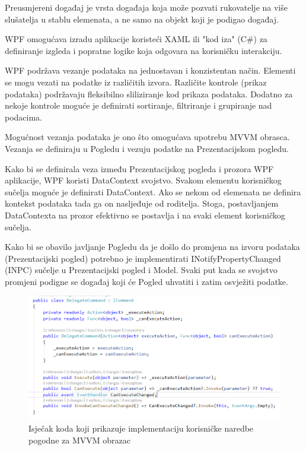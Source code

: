 \documentclass[times, utf8, diplomski]{fer}
\begin{document}
Preusmjereni događaj  je vrsta događaja koja može pozvati rukovatelje  na više slušatelja u stablu elemenata, a ne samo na objekt koji je podigao događaj. 

WPF omogućava izradu aplikacije koristeći XAML ili "kod iza" (C\#) za definiranje izgleda i popratne logike koja odgovara na korisničku interakciju.

WPF podržava vezanje podataka na jednostavan i konzistentan način. Elementi se mogu vezati na podatke iz različitih izvora. Različite kontrole (prikaz podataka) podržavaju fleksibilno sliliziranje kod prikaza podataka. Dodatno za nekoje kontrole moguće je definirati sortiranje, filtriranje i grupiranje nad podacima.

Mogućnost vezanja podataka je ono što omogućava upotrebu MVVM obrasca. Vezanja se definiraju u Pogledu i vezuju podatke na Prezentacijskom pogledu.

Kako bi se definirala veza između Prezentacijskog pogleda i prozora WPF aplikacije, WPF koristi DataContext svojstvo. Svakom elementu korisničkog sučelja moguće je definirati DataContext. Ako se nekom od elemenata ne definira kontekst podataka tada ga on nasljeđuje od roditelja. Stoga, postavljanjem DataContexta na prozor efektivno se postavlja i na svaki element korisničkog sučelja.

Kako bi se obavilo javljanje Pogledu da je došlo do promjena na izvoru podataka (Prezentacijski pogled) potrebno je implementirati  INotifyPropertyChanged (INPC) sučelje u Prezentacijski pogled i Model. Svaki put kada se svojstvo promjeni podigne se događaj koji će Pogled uhvatiti i zatim osvježiti podatke.

\begin{figure}[htb]
\centering
\includegraphics[width=14cm]{delegatecommand.PNG}
\caption{Isječak koda koji prikazuje implementaciju korisničke naredbe pogodne za MVVM obrazac}
\label{fig:delegatecommand}
\end{figure}
\end{document}

